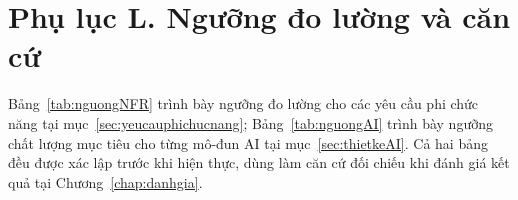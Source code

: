 
\section*{Phụ lục L. Ngưỡng đo lường và căn cứ}
\label{apdx:nguong}

Bảng~\ref{tab:nguongNFR} trình bày ngưỡng đo lường cho các yêu cầu phi chức
năng tại mục~\ref{sec:yeucauphichucnang}; Bảng~\ref{tab:nguongAI} trình bày
ngưỡng chất lượng mục tiêu cho từng mô-đun AI tại mục~\ref{sec:thietkeAI}.
Cả hai bảng đều được xác lập trước khi hiện thực, dùng làm căn cứ đối chiếu
khi đánh giá kết quả tại Chương~\ref{chap:danhgia}.

\begingroup
\tblsetup\tblzebra
